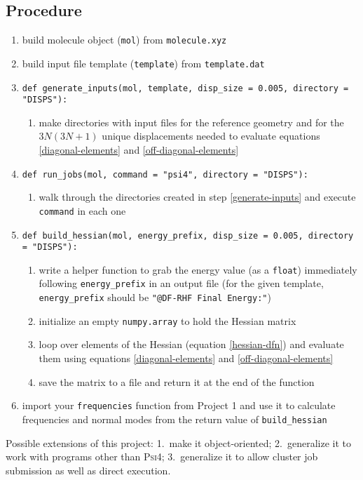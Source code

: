 \documentclass[fleqn]{article}
\newcommand{\linl}[1]{\lstinline{#1}{}}
\begin{document}
\subsection*{Procedure}

\begin{enumerate}
  \item build molecule object (\linl{mol}) from \linl{molecule.xyz}
  \item build input file template (\linl{template}) from \linl{template.dat}
  \item\label{generate-inputs}
  \linl{def generate_inputs(mol, template, disp_size = 0.005, directory = "DISPS"):}
  \begin{enumerate}
    \item make directories with input files for the reference geometry and for the $3N(3N+1)$ unique displacements needed to evaluate equations \ref{diagonal-elements} and \ref{off-diagonal-elements}
  \end{enumerate}
  \item \linl{def run_jobs(mol, command = "psi4", directory = "DISPS"):}
  \begin{enumerate}
    \item walk through the directories created in step \ref{generate-inputs} and execute \linl{command} in each one
  \end{enumerate}
  \item \linl{def build_hessian(mol, energy_prefix, disp_size = 0.005, directory = "DISPS"):}
  \begin{enumerate}
    \item write a helper function to grab the energy value (as a \linl{float}) immediately following \linl{energy_prefix} in an output file (for the given template, \linl{energy_prefix} should be \linl{"@DF-RHF Final Energy:"})
    \item initialize an empty \linl{numpy.array} to hold the Hessian matrix
    \item loop over elements of the Hessian (equation \ref{hessian-dfn}) and evaluate them using equations \ref{diagonal-elements} and \ref{off-diagonal-elements}
    \item save the matrix to a file and return it at the end of the function
  \end{enumerate}
  \item import your \linl{frequencies} function from Project 1 and use it to calculate frequencies and normal modes from the return value of \linl{build_hessian}
\end{enumerate}
Possible extensions of this project: 1.~make it object-oriented; 2.~generalize it to work with programs other than \textsc{Psi4}; 3.~generalize it to allow cluster job submission as well as direct execution.
\end{document}
